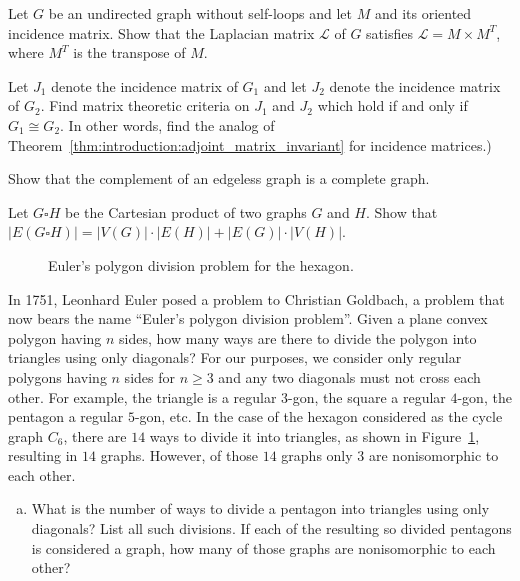 \begin{problem}
\item Let $G$ be an undirected graph without self-loops and let $M$
  and its oriented incidence matrix. Show that the Laplacian matrix
  $\mathcal{L}$ of $G$ satisfies $\mathcal{L} = M \times M^T$, where
  $M^T$ is the transpose of $M$.

\item Let $J_1$ denote the incidence matrix of $G_1$ and let $J_2$
  denote the incidence matrix of $G_2$. Find matrix theoretic criteria
  on $J_1$ and $J_2$ which hold if and only if $G_1 \cong G_2$. In
  other words, find the analog of
  Theorem~\ref{thm:introduction:adjoint_matrix_invariant} for
  incidence matrices.)

\item Show that the complement of an edgeless graph is a complete
  graph.

\item Let $G \square H$ be the Cartesian product of two graphs $G$ and
  $H$. Show that
  $|E(G \square H)| = |V(G)| \cdot |E(H)| + |E(G)| \cdot |V(H)|$.

\begin{figure}[!htbp]
\centering
{}

\caption{Euler's polygon division problem for the hexagon.}
\label{fig:introduction:Euler_polygon_division_hexagon}
\end{figure}

\item In 1751, Leonhard Euler posed a problem
  to Christian Goldbach, a problem that now
  bears the name ``Euler's polygon division
  problem''. Given a
  plane convex polygon having $n$ sides, how many ways are there to
  divide the polygon into triangles using only diagonals? For our
  purposes, we consider only regular polygons having $n$ sides for
  $n \geq 3$ and any two diagonals must not cross each other. For
  example, the triangle is a regular $3$-gon, the square a regular
  $4$-gon, the pentagon a regular $5$-gon, etc. In the case of the
  hexagon considered as the cycle graph $C_6$, there are $14$ ways to
  divide it into triangles, as shown in
  Figure~\ref{fig:introduction:Euler_polygon_division_hexagon},
  resulting in $14$ graphs. However, of those $14$ graphs only $3$ are
  nonisomorphic to each other.
  \begin{enumerate}[(a)]
  \item What is the number of ways to
    divide a pentagon
    into triangles using only diagonals? List all such divisions. If
    each of the resulting so divided pentagons is considered a graph,
    how many of those graphs are
    nonisomorphic to each other?


\end{enumerate}
\end{problem}
